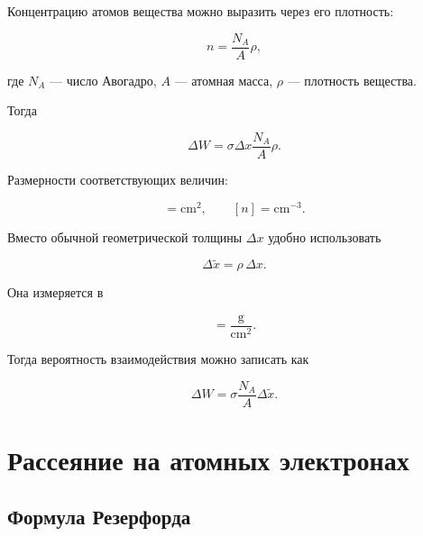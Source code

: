 \documentclass[../final.tex]{subfiles}
\begin{document}
Концентрацию атомов вещества можно выразить через его плотность:

\begin{equation*}
    n
    =
    \frac{N_A}{A}\rho,
\end{equation*}

где $N_A$ --- число Авогадро, $A$ --- атомная масса,
$\rho$ --- плотность вещества.

Тогда

\begin{equation*}
    \Delta W
    =
    \sigma
    \Delta x
    \frac{N_A}{A}
    \rho.
\end{equation*}

Размерности соответствующих величин:

\begin{equation*}
    [\sigma]
    =
    \mathrm{cm^2},
    \qquad
    [n]
    =
    \mathrm{cm^{-3}}.
\end{equation*}

Вместо обычной геометрической толщины $\Delta x$ удобно использовать

\begin{equation*}
    \Delta\widetilde{x}
    =
    \rho\,\Delta x.
\end{equation*}

Она измеряется в

\begin{equation*}
    [\Delta\widetilde{x}]
    =
    \frac{\mathrm{g}}{\mathrm{cm^2}}.
\end{equation*}

Тогда вероятность взаимодействия можно записать как

\begin{equation*}
    \Delta W
    =
    \sigma
    \frac{N_A}{A}
    \Delta\widetilde{x}.
\end{equation*}

\section{Рассеяние на атомных электронах}

\subsection{Формула Резерфорда}
\end{document}
